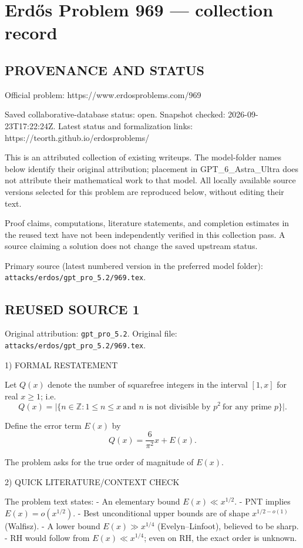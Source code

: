 \section*{Erd\H{o}s Problem 969 --- collection record}

\subsection*{PROVENANCE AND STATUS}
Official problem: https://www.erdosproblems.com/969

Saved collaborative-database status: open.
Snapshot checked: 2026-09-23T17:22:24Z.
Latest status and formalization links: https://teorth.github.io/erdosproblems/

This is an attributed collection of existing writeups. The model-folder names below identify their original attribution; placement in GPT\_6\_Astra\_Ultra does not attribute their mathematical work to that model. All locally available source versions selected for this problem are reproduced below, without editing their text.

Proof claims, computations, literature statements, and completion estimates in the reused text have not been independently verified in this collection pass. A source claiming a solution does not change the saved upstream status.

Primary source (latest numbered version in the preferred model folder): \texttt{attacks/erdos/gpt\_pro\_5.2/969.tex}.

\subsection*{REUSED SOURCE 1}
Original attribution: \texttt{gpt\_pro\_5.2}.
Original file: \texttt{attacks/erdos/gpt\_pro\_5.2/969.tex}.


1) FORMAL RESTATEMENT

Let $Q(x)$ denote the number of squarefree integers in the interval $[1,x]$ for real $x\ge 1$; i.e.
\[
Q(x)=\bigl|\{n\in\mathbb Z: 1\le n\le x\ \text{and } n \text{ is not divisible by } p^2\ \text{for any prime }p\}\bigr|.
\]

Define the error term $E(x)$ by
\[
Q(x)=\frac{6}{\pi^2}x + E(x).
\]

The problem asks for the true order of magnitude of $E(x)$.

2) QUICK LITERATURE/CONTEXT CHECK

The problem text states:
- An elementary bound $E(x)\ll x^{1/2}$.
- PNT implies $E(x)=o(x^{1/2})$.
- Best unconditional upper bounds are of shape $x^{1/2-o(1)}$ (Walfisz).
- A lower bound $E(x)\gg x^{1/4}$ (Evelyn--Linfoot), believed to be sharp.
- RH would follow from $E(x)\ll x^{1/4}$; even on RH, the exact order is unknown.

